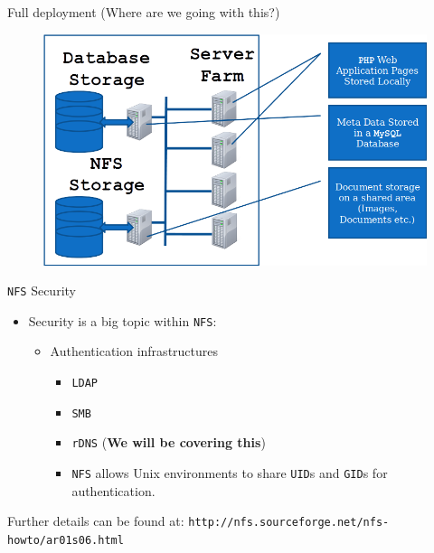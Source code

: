 \documentclass[xcolor=table]{beamer}
\begin{document}
\begin{frame}{Full deployment (Where are we going with this?)}
  \begin{figure}
    \begin{center}
      \includegraphics[width=1\linewidth]{FullDeployment.png}
    \end{center}
  \end{figure}
\end{frame}

\begin{frame}{\texttt{NFS} Security}
  \begin{itemize}
    \item Security is a big topic within \texttt{NFS}:
      \begin{itemize}
        \item Authentication infrastructures  
          \begin{itemize}
            \item \texttt{LDAP}
            \item \texttt{SMB}
            \item \texttt{rDNS} (\textbf{We will be covering this})
            \item \texttt{NFS} allows Unix environments to share \texttt{UID}s and \texttt{GID}s for authentication.
          \end{itemize}
      \end{itemize}
  \end{itemize}
  \begin{tcolorbox}
    \begin{center}
      \scriptsize Further details can be found at: \texttt{http://nfs.sourceforge.net/nfs-howto/ar01s06.html}
    \end{center}
  \end{tcolorbox}
\end{frame}
\end{document}
